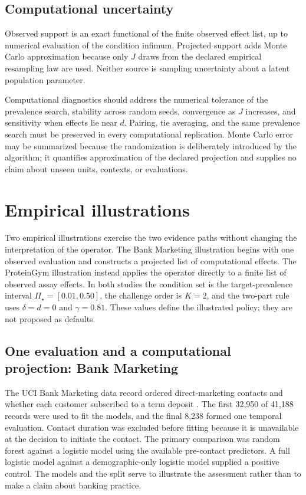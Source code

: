 \documentclass[11pt]{article}
\newcommand{\PSet}{\Pi_\star}
\theoremstyle{remark}
\begin{document}
\subsection{Computational uncertainty}

Observed support is an exact functional of the finite observed effect list, up
to numerical evaluation of the condition infimum. Projected support adds
Monte Carlo approximation because only $J$ draws from the declared empirical
resampling law are used. Neither source is sampling uncertainty about a latent
population parameter.

Computational diagnostics should address the numerical tolerance of the
prevalence search, stability across random seeds, convergence as $J$ increases,
and sensitivity when effects lie near $d$. Pairing, tie averaging, and the same
prevalence search must be preserved in every computational replication. Monte
Carlo error may be summarized because the randomization is deliberately
introduced by the algorithm; it quantifies approximation of the declared
projection and supplies no claim about unseen units, contexts, or evaluations.

\section{Empirical illustrations}
\label{sec:illustrations}

Two empirical illustrations exercise the two evidence paths without changing
the interpretation of the operator. The Bank Marketing illustration begins
with one observed evaluation and constructs a projected list of computational
effects. The ProteinGym illustration instead applies the operator directly to
a finite list of observed assay effects. In both studies the condition set is
the target-prevalence interval $\PSet=[0.01,0.50]$, the challenge order is
$K=2$, and the two-part rule uses $\delta=d=0$ and $\gamma=0.81$. These values
define the illustrated policy; they are not proposed as defaults.

\subsection{One evaluation and a computational projection: Bank Marketing}
\label{sec:bank-illustration}

The UCI Bank Marketing data record ordered direct-marketing contacts and
whether each customer subscribed to a term deposit \cite{moro2014bank}. The
first 32,950 of 41,188 records were used to fit the models, and the final 8,238
formed one temporal evaluation. Contact duration was excluded before fitting
because it is unavailable at the decision to initiate the contact. The primary
comparison was random forest against a logistic model using the available
pre-contact predictors. A full logistic model against a demographic-only
logistic model supplied a positive control. The models and the split serve to
illustrate the assessment rather than to make a claim about banking practice.
\end{document}
